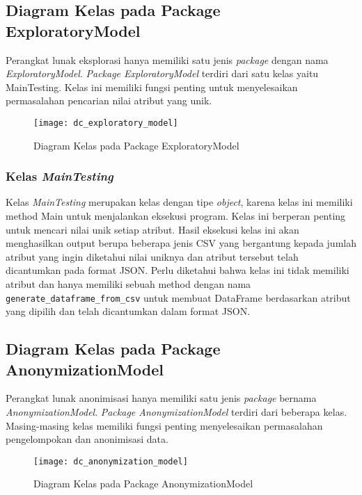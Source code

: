 \subsection{Diagram Kelas pada Package ExploratoryModel}

\noindent Perangkat lunak eksplorasi hanya memiliki satu jenis \textit{package} dengan nama \textit{ExploratoryModel}. \textit{Package ExploratoryModel} terdiri dari satu kelas yaitu MainTesting. Kelas ini memiliki fungsi penting untuk menyelesaikan permasalahan pencarian nilai atribut yang unik.

\begin{figure}[H]
	\centering
	\texttt{[image: dc\_exploratory\_model]}
	\caption{Diagram Kelas pada Package ExploratoryModel}
	\label{fig:dc_exploratory_model}
\end{figure}

\subsubsection{Kelas \textit{MainTesting}}
Kelas \textit{MainTesting} merupakan kelas dengan tipe \textit{object}, karena kelas ini memiliki method Main untuk menjalankan eksekusi program. Kelas ini berperan penting untuk mencari nilai unik setiap atribut. Hasil eksekusi kelas ini akan menghasilkan output berupa beberapa jenis CSV yang bergantung kepada jumlah atribut yang ingin diketahui nilai uniknya dan atribut tersebut telah dicantumkan pada format JSON. Perlu diketahui bahwa kelas ini tidak memiliki atribut dan hanya memiliki sebuah method dengan nama \texttt{generate\_dataframe\_from\_csv} untuk membuat DataFrame berdasarkan atribut yang dipilih dan telah dicantumkan dalam format JSON.



\subsection{Diagram Kelas pada Package AnonymizationModel}

\noindent Perangkat lunak anonimisasi hanya memiliki satu jenis \textit{package}  bernama \textit{AnonymizationModel}. \textit{Package AnonymizationModel} terdiri dari beberapa kelas. Masing-masing kelas memiliki fungsi penting menyelesaikan permasalahan pengelompokan dan anonimisasi data.

\begin{figure}[H]
	\centering
	\texttt{[image: dc\_anonymization\_model]}
	\caption{Diagram Kelas pada Package AnonymizationModel}
	\label{fig:dc_anonymization_model}
\end{figure}

